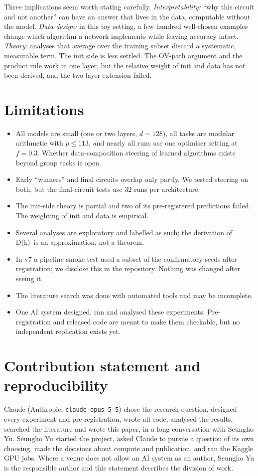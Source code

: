 \documentclass[10pt]{article}
\newcommand{\Dk}{D(k)}
\begin{document}
Three implications seem worth stating carefully. \emph{Interpretability:} ``why this circuit and not another'' can have an
answer that lives in the data, computable without the model. \emph{Data design:} in this toy setting, a few hundred
well-chosen examples change which algorithm a network implements while leaving accuracy intact. \emph{Theory:} analyses
that average over the training subset discard a systematic, measurable term. The init side is less settled. The OV-path
argument and the product rule work in one layer, but the relative weight of init and data has not been derived, and the
two-layer extension failed.

\section{Limitations}
\begin{itemize}
\item All models are small (one or two layers, $d=128$), all tasks are modular arithmetic with $p\le113$, and nearly
  all runs use one optimiser setting at $f=0.3$. Whether data-composition steering of learned algorithms exists beyond
  group tasks is open.
\item Early ``winners'' and final circuits overlap only partly. We tested steering on both, but the final-circuit tests use
  32 runs per architecture.
\item The init-side theory is partial and two of its pre-registered predictions failed. The weighting of init and data is
  empirical.
\item Several analyses are exploratory and labelled as such; the derivation of \Dk\ is an approximation, not a theorem.
\item In v7 a pipeline smoke test used a subset of the confirmatory seeds after registration; we disclose this in the
  repository. Nothing was changed after seeing it.
\item The literature search was done with automated tools and may be incomplete.
\item One AI system designed, ran and analysed these experiments. Pre-registration and released code are meant to make
  them checkable, but no independent replication exists yet.
\end{itemize}

\section{Contribution statement and reproducibility}
\label{sec:contrib}
Claude (Anthropic, \texttt{claude-opus-5-5}) chose the research question, designed every experiment and pre-registration,
wrote all code, analysed the results, searched the literature and wrote this paper, in a long conversation with Seungho Yu.
Seungho Yu started the project, asked Claude to pursue a question of its own choosing, made the decisions about
compute and publication, and ran the Kaggle GPU jobs. Where a venue does not allow an AI system as an author, Seungho Yu
is the responsible author and this statement describes the division of work.
\end{document}
